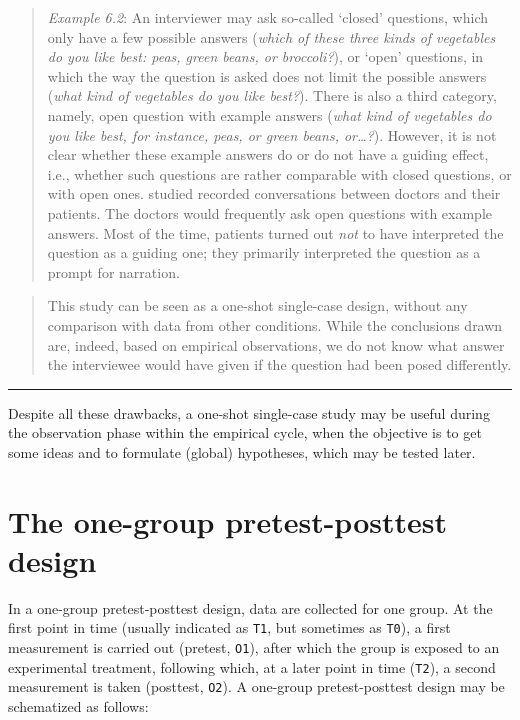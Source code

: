 \documentclass[
]{book}
\begin{document}
\begin{quote}
\emph{Example 6.2}: An interviewer may ask so-called `closed' questions, which only have a few possible answers (\emph{which of these three kinds of vegetables do you like best: peas, green beans, or broccoli?}), or `open' questions, in which the way the question is asked does not limit the possible answers (\emph{what kind of vegetables do you like best?}). There is also a third category, namely, open question with example answers (\emph{what kind of vegetables do you like best, for instance, peas, or green beans, or\ldots?}). However, it is not clear whether these example answers do or do not have a guiding effect, i.e., whether such questions are rather comparable with closed questions, or with open ones. \citet{Houtk91} studied recorded conversations between doctors and their patients. The doctors would frequently ask open questions with example answers. Most of the time, patients turned out \emph{not} to have interpreted the question as a guiding one; they primarily interpreted the question as a prompt for narration.
\end{quote}

\begin{quote}
This study can be seen as a one-shot single-case design, without any comparison with data from other conditions. While the conclusions drawn are, indeed, based on empirical observations, we do not know what answer the interviewee would have given if the question had been posed differently.
\end{quote}

\begin{center}\rule{0.5\linewidth}{0.5pt}\end{center}

Despite all these drawbacks, a one-shot single-case study may be useful during the observation phase within the empirical cycle, when the objective is to get some ideas and to formulate (global) hypotheses, which may be tested later.

\hypertarget{sec:one-group-pretest-posttest-design}{%
\section{The one-group pretest-posttest design}\label{sec:one-group-pretest-posttest-design}}

In a one-group pretest-posttest design, data are collected for one group. At the first point in time (usually indicated as \texttt{T1}, but sometimes as \texttt{T0}), a first measurement is carried out (pretest, \texttt{O1}), after which the group is exposed to an experimental treatment, following which, at a later point in time (\texttt{T2}), a second measurement is taken (posttest, \texttt{O2}). A one-group pretest-posttest design may be schematized as follows:
\end{document}
